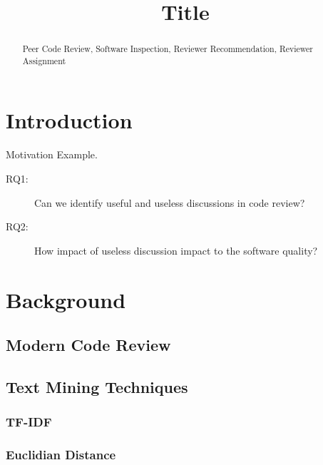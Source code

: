 \documentclass[conference]{IEEEtran}
\begin{document}
\title{Title}

\maketitle
{}
{\newcommand{\nbnote}[2]{
  \fcolorbox{blue}{yellow}{\bfseries\sffamily\scriptsize#1}
  {\sf\small\textit{#2}}
 }
}
{\newcommand{\nbnote}[2]{}
 \newcommand{\version}{}
}
\newcommand\pick[1]{\nbnote{Pick}{\textcolor{magenta}{#1}}}
\newcommand\thai[1]{\nbnote{Yoshida}{\textcolor{blue}{#1}}}


\begin{abstract}


\begin{IEEEkeywords}
Peer Code Review, Software Inspection, Reviewer Recommendation, Reviewer Assignment
\end{IEEEkeywords}
\end{abstract}

\section{Introduction}
Motivation Example.
\begin{description}
\item[RQ1:] Can we identify useful and useless discussions in code review?
\item[RQ2:] How impact of useless discussion impact to the software quality?
\end{description}
\section{Background}
\subsection{Modern Code Review}
\subsection{Text Mining Techniques}
\subsubsection{TF-IDF}
\subsubsection{Euclidian Distance}
\end{document}
